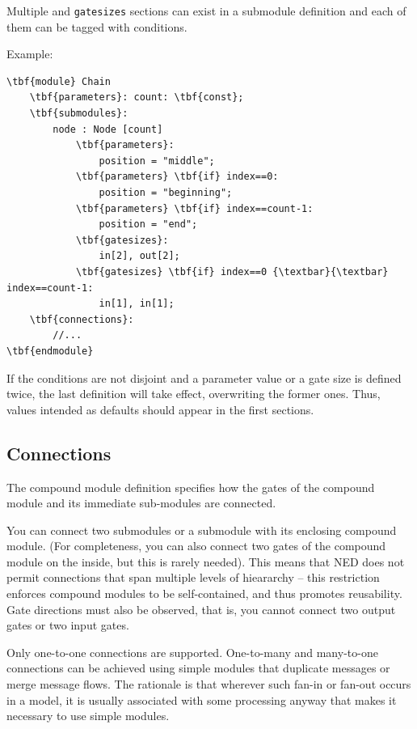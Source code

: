 Multiple  and
\texttt{gatesizes} sections can exist in a submodule
definition and each of them can be tagged with
conditions.

Example:

\begin{Verbatim}[commandchars=\\\{\}]
\tbf{module} Chain
    \tbf{parameters}: count: \tbf{const};
    \tbf{submodules}:
        node : Node [count]
            \tbf{parameters}:
                position = "middle";
            \tbf{parameters} \tbf{if} index==0:
                position = "beginning";
            \tbf{parameters} \tbf{if} index==count-1:
                position = "end";
            \tbf{gatesizes}:
                in[2], out[2];
            \tbf{gatesizes} \tbf{if} index==0 {\textbar}{\textbar} index==count-1:
                in[1], in[1];
    \tbf{connections}:
        //...
\tbf{endmodule}
\end{Verbatim}

If the conditions are not disjoint and a parameter value or a
gate size is defined twice, the last definition will take effect,
overwriting the former ones. Thus, values intended as defaults
should appear in the first sections.



\subsection{Connections}


The compound module definition specifies how the gates of the compound
module and its immediate sub-modules are connected.

You can connect two submodules or a submodule with its enclosing
compound module. (For completeness, you can also connect two gates
of the compound module on the inside, but this is rarely needed).
This means that NED does not permit connections that span
multiple levels of hieararchy -- this restriction
enforces compound modules to be self-contained, and thus promotes
reusability. Gate directions must also be observed,
that is, you cannot connect two output gates or two input gates.

Only one-to-one connections are supported. One-to-many and many-to-one
connections can be achieved using simple modules that duplicate
messages or merge message flows. The rationale is that wherever
such fan-in or fan-out occurs in a model, it is usually associated
with some processing anyway that makes it necessary to use
simple modules.

